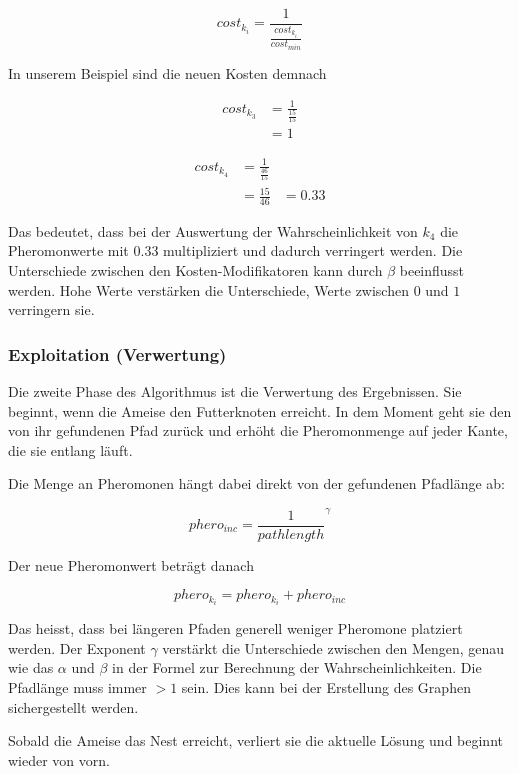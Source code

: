 \[ cost_{k_i} = \frac{1}{\frac{cost_{k_i}}{cost_{min}}} \]

In unserem Beispiel sind die neuen Kosten demnach

\begin{equation*}
\begin{split}
cost_{k_3} & = \frac{1}{\frac{15}{15}} \\
           & = 1
\end{split}
\end{equation*}

\begin{equation*}
\begin{split}
cost_{k_4} & = \frac{1}{\frac{46}{15}} \\
           & = \frac{15}{46}
           & = 0.33
\end{split}
\end{equation*}

Das bedeutet, dass bei der Auswertung der Wahrscheinlichkeit von $k_4$ die Pheromonwerte mit $0.33$ multipliziert und dadurch verringert werden. Die Unterschiede zwischen den Kosten-Modifikatoren kann durch $\beta$ beeinflusst werden. Hohe Werte verstärken die Unterschiede, Werte zwischen $0$ und $1$ verringern sie.

\subsubsection*{Exploitation (Verwertung)}

Die zweite Phase des Algorithmus ist die Verwertung des Ergebnissen. Sie beginnt, wenn die Ameise den Futterknoten erreicht. In dem Moment geht sie den von ihr gefundenen Pfad zurück und erhöht die Pheromonmenge auf jeder Kante, die sie entlang läuft.

Die Menge an Pheromonen hängt dabei direkt von der gefundenen Pfadlänge ab:

\[ phero_{inc} = {\frac{1}{pathlength}}^\gamma \]

Der neue Pheromonwert beträgt danach 

\[ phero_{k_i} = phero_{k_i} + phero_{inc} \]

Das heisst, dass bei längeren Pfaden generell weniger Pheromone platziert werden. Der Exponent $\gamma$ verstärkt die Unterschiede zwischen den Mengen, genau wie das $\alpha$ und $\beta$ in der Formel zur Berechnung der Wahrscheinlichkeiten. Die Pfadlänge muss immer $> 1$ sein. Dies kann bei der Erstellung des Graphen sichergestellt werden.

Sobald die Ameise das Nest erreicht, verliert sie die aktuelle Lösung und beginnt wieder von vorn.

